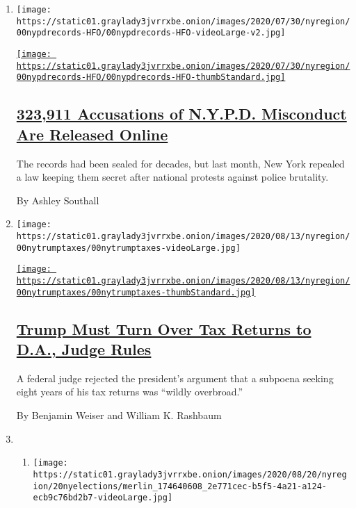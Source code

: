\begin{enumerate}
\def\labelenumi{\arabic{enumi}.}
\item
  \texttt{[image: https://static01.graylady3jvrrxbe.onion/images/2020/07/30/nyregion/00nypdrecords-HFO/00nypdrecords-HFO-videoLarge-v2.jpg]}

  \href{/2020/08/20/nyregion/nypd-ccrb-records-published.html}{\texttt{[image: https://static01.graylady3jvrrxbe.onion/images/2020/07/30/nyregion/00nypdrecords-HFO/00nypdrecords-HFO-thumbStandard.jpg]}}

  \hypertarget{323911-accusations-of-nypd-misconduct-are-released-online}{%
  \subsection{\texorpdfstring{\href{/2020/08/20/nyregion/nypd-ccrb-records-published.html}{323,911
  Accusations of N.Y.P.D. Misconduct Are Released
  Online}}{323,911 Accusations of N.Y.P.D. Misconduct Are Released Online}}\label{323911-accusations-of-nypd-misconduct-are-released-online}}

  The records had been sealed for decades, but last month, New York
  repealed a law keeping them secret after national protests against
  police brutality.

  By Ashley Southall
\item
  \texttt{[image: https://static01.graylady3jvrrxbe.onion/images/2020/08/13/nyregion/00nytrumptaxes/00nytrumptaxes-videoLarge.jpg]}

  \href{/2020/08/20/nyregion/donald-trump-taxes-cyrus-vance.html}{\texttt{[image: https://static01.graylady3jvrrxbe.onion/images/2020/08/13/nyregion/00nytrumptaxes/00nytrumptaxes-thumbStandard.jpg]}}

  \hypertarget{trump-must-turn-over-tax-returns-to-da-judge-rules}{%
  \subsection{\texorpdfstring{\href{/2020/08/20/nyregion/donald-trump-taxes-cyrus-vance.html}{Trump
  Must Turn Over Tax Returns to D.A., Judge
  Rules}}{Trump Must Turn Over Tax Returns to D.A., Judge Rules}}\label{trump-must-turn-over-tax-returns-to-da-judge-rules}}

  A federal judge rejected the president's argument that a subpoena
  seeking eight years of his tax returns was ``wildly overbroad.''

  By Benjamin Weiser and William K. Rashbaum
\item
  \begin{enumerate}
  \def\labelenumii{\arabic{enumii}.}
  \item
    \texttt{[image: https://static01.graylady3jvrrxbe.onion/images/2020/08/20/nyregion/20nyelections/merlin\_174640608\_2e771cec-b5f5-4a21-a124-ecb9c76bd2b7-videoLarge.jpg]}


\end{enumerate}
\end{enumerate}
